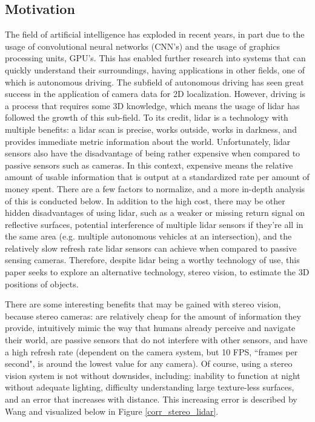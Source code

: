 \subsection{Motivation}
The field of artificial intelligence has exploded in recent years, in part due to the usage of convolutional neural networks (CNN's) and the usage of graphics processing units, GPU's. This has enabled further research into systems that can quickly understand their surroundings, having applications in other fields, one of which is autonomous driving. The subfield of autonomous driving has seen great success in the application of camera data for 2D localization. However, driving is a process that requires some 3D knowledge, which means the usage of lidar has followed the growth of this sub-field. To its credit, lidar is a technology with multiple benefits: a lidar scan is precise, works outside, works in darkness, and provides immediate metric information about the world. Unfortunately, lidar sensors also have the disadvantage of being rather expensive when compared to passive sensors such as cameras. In this context, expensive means the relative amount of usable information that is output at a standardized rate per amount of money spent. There are a few factors to normalize, and a more in-depth analysis of this is conducted below. In addition to the high cost, there may be other hidden disadvantages of using lidar, such as a weaker or missing return signal on reflective surfaces, potential interference of multiple lidar sensors if they're all in the same area (e.g. multiple autonomous vehicles at an intersection), and the relatively slow refresh rate lidar sensors can achieve when compared to passive sensing cameras. Therefore, despite lidar being a worthy technology of use, this paper seeks to explore an alternative technology, stereo vision, to estimate the 3D positions of objects.

There are some interesting benefits that may be gained with stereo vision, because stereo cameras: are relatively cheap for the amount of information they provide, intuitively mimic the way that humans already perceive and navigate their world, are passive sensors that do not interfere with other sensors, and have a high refresh rate (dependent on the camera system, but 10 FPS, ``frames per second", is around the lowest value for any camera). Of course, using a stereo vision system is not without downsides, including: inability to function at night without adequate lighting, difficulty understanding large texture-less surfaces, and an error that increases with distance. This increasing error is described by Wang \cite{wang_pseudo-lidar_2019} and visualized below in Figure \ref{corr_stereo_lidar}.

